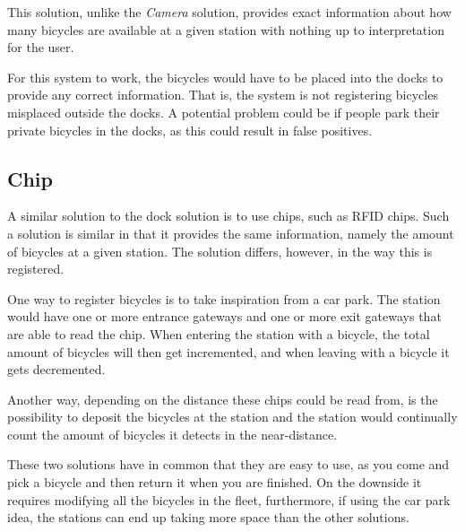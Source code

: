 This solution, unlike the \textit{Camera} solution, provides exact information about how many bicycles are available at a given station with nothing up to interpretation for the user.

For this system to work, the bicycles would have to be placed into the docks to provide any correct information.
That is, the system is not registering bicycles misplaced outside the docks.
A potential problem could be if people park their private bicycles in the docks, as this could result in false positives.

\subsection{Chip}
A similar solution to the dock solution is to use chips, such as RFID chips. 
Such a solution is similar in that it provides the same information, namely the amount of bicycles at a given station.
The solution differs, however, in the way this is registered.

One way to register bicycles is to take inspiration from a car park.
The station would have one or more entrance gateways and one or more exit gateways that are able to read the chip.
When entering the station with a bicycle, the total amount of bicycles will then get incremented, and when leaving with a bicycle it gets decremented.

Another way, depending on the distance these chips could be read from, is the possibility to deposit the bicycles at the station and the station would continually count the amount of bicycles it detects in the near-distance.

These two solutions have in common that they are easy to use, as you come and pick a bicycle and then return it when you are finished.
On the downside it requires modifying all the bicycles in the fleet, furthermore, if using the car park idea, the stations can end up taking more space than the other solutions. 


